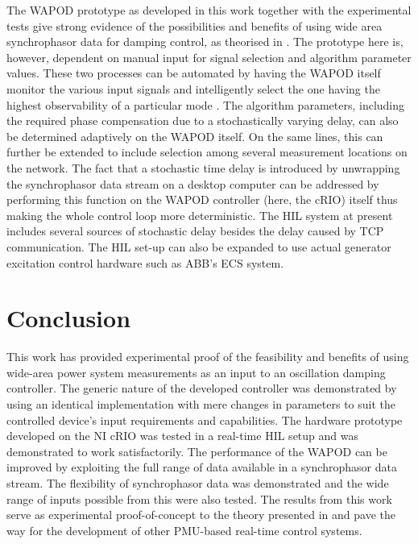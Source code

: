 \documentclass[journal]{IEEEtran}
\begin{document}
The WAPOD prototype as developed in this work together with the experimental tests give strong evidence of the possibilities and benefits of using wide area synchrophasor data for damping control, as theorised in \cite{Yuwa}. The prototype here is, however, dependent on manual input for signal selection and algorithm parameter values. These two processes can be automated by having the WAPOD itself monitor the various input signals and intelligently select the one having the highest observability of a particular mode \cite{Yuwa}. The algorithm parameters, including the required phase compensation due to a stochastically varying delay, can also be determined adaptively on the WAPOD itself. On the same lines, this can further be extended to include selection among several measurement locations on the network. The fact that a stochastic time delay is introduced by unwrapping the synchrophasor data stream on a desktop computer can be addressed by performing this function on the WAPOD controller (here, the cRIO) itself thus making the whole control loop more deterministic. The HIL system at present includes several sources of stochastic delay besides the delay caused by TCP communication. The HIL set-up can also be expanded to use actual generator excitation control hardware such as ABB's ECS system.

\section{Conclusion}\label{Conclusion}
This work has provided experimental proof of the feasibility and benefits of using wide-area power system measurements as an input to an oscillation damping controller. The generic nature of the developed controller was demonstrated by using an identical implementation with mere changes in parameters to suit the controlled device's input requirements and capabilities. The hardware prototype developed on the NI cRIO was tested in a real-time HIL setup and was demonstrated to work satisfactorily. The performance of the WAPOD can be improved by exploiting the full range of data available in a synchrophasor data stream. The flexibility of synchrophasor data was demonstrated and the wide range of inputs possible from this were also tested. The results from this work serve as experimental proof-of-concept to the theory presented in \cite{Yuwa} and pave the way for the development of other PMU-based real-time control systems.

\end{document}
